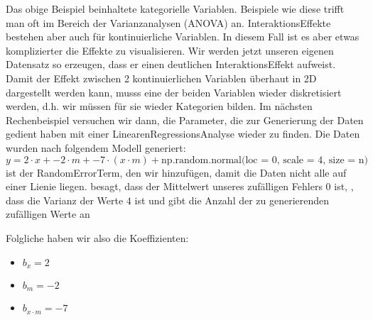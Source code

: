 \documentclass[letterpaper,10pt,english]{jupyterBook}
\begin{document}
\sphinxAtStartPar
Das obige Beispiel beinhaltete kategorielle Variablen. Beispiele wie diese trifft man oft im Bereich der Varianzanalysen (ANOVA) an.
Interaktions\sphinxhyphen{}Effekte bestehen aber auch für kontinuierliche Variablen. In diesem Fall ist es aber etwas komplizierter die Effekte zu visualisieren.
Wir werden jetzt unseren eigenen Datensatz so erzeugen, dass er einen deutlichen Interaktions\sphinxhyphen{}Effekt aufweist. Damit der Effekt zwischen 2 kontinuierlichen Variablen überhaut in 2D dargestellt werden kann, musss eine der beiden Variablen wieder diskretisiert werden, d.h. wir müssen für sie wieder Kategorien bilden.
Im nächsten Rechenbeispiel versuchen wir dann, die Parameter, die zur Generierung der Daten gedient haben mit einer Linearen\sphinxhyphen{}Regressions\sphinxhyphen{}Analyse wieder zu finden.
Die Daten wurden nach folgendem Modell generiert:
\begin{equation*}
y = 2\cdot x + -2\cdot m + -7\cdot (x\cdot m) + \text{np.random.normal(loc = 0, scale = 4, size = n)}
\end{equation*}
\sphinxAtStartPar
{} ist der Random\sphinxhyphen{}Error\sphinxhyphen{}Term, den wir hinzufügen, damit die Daten nicht alle auf einer Lienie liegen.  besagt, dass der Mittelwert unseres zufälligen Fehlers \(0\) ist, , dass die Varianz der Werte \(4\) ist und  gibt die Anzahl der zu generierenden zufälligen Werte an

\sphinxAtStartPar
Folgliche haben wir also die Koeffizienten:
\begin{itemize}
\item {} 
\sphinxAtStartPar
\(b_x = 2\)

\item {} 
\sphinxAtStartPar
\(b_m = -2\)

\item {} 
\sphinxAtStartPar
\(b_{x\cdot m} = -7\)

\end{itemize}
\end{document}
